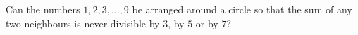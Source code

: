 Can the numbers $1,2,3,\dots,9$ be arranged around a circle so that the sum of any two neighbours is never divisible by $3$, by $5$ or by $7$?
